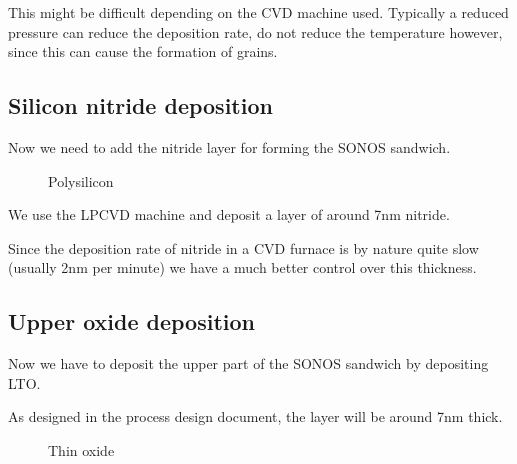 This might be difficult depending on the CVD machine used. Typically a reduced pressure can reduce the deposition rate, do not reduce the temperature however, since this can cause the formation of grains.

\subsection{Silicon nitride deposition}\label{step_depositing_sonos_nitride}

Now we need to add the nitride layer for forming the SONOS sandwich.

\begin{figure}[H]
	\centering
	\begin{tikzpicture}[node distance = 3cm, auto, thick,scale=\CrossSectionOnly, every node/.style={transform shape}]
		
	\end{tikzpicture}
	\drawStepArrow{}
	\begin{tikzpicture}[node distance = 3cm, auto, thick,scale=\CrossSectionOnly, every node/.style={transform shape}]
		
	\end{tikzpicture}
	\caption{Polysilicon}
\end{figure}

We use the LPCVD machine and deposit a layer of around 7nm nitride.

Since the deposition rate of nitride in a CVD furnace is by nature quite slow (usually 2nm per minute) we have a much better control over this thickness.

\newpage

\subsection{Upper oxide deposition}\label{step_growing_gate_oxide}

Now we have to deposit the upper part of the SONOS sandwich by depositing LTO.

As designed in the process design document, the layer will be around 7nm thick.

\begin{figure}[H]
	\centering
	\begin{tikzpicture}[node distance = 3cm, auto, thick,scale=\CrossSectionOnly, every node/.style={transform shape}]
		
	\end{tikzpicture}
	\begin{tikzpicture}[node distance = 3cm, auto, thick,scale=\CrossSectionOnly, every node/.style={transform shape}]
		
	\end{tikzpicture}
	\caption{Thin oxide}
\end{figure}

